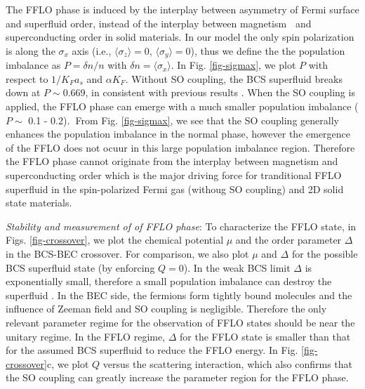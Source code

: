 \documentclass[prl,showpacs,twocolumn]{revtex4}
\begin{document}
The FFLO phase is induced by the interplay between asymmetry of Fermi
surface and superfluid order, instead of the interplay between magnetism%
\textbf{\ }and superconducting order in solid materials. In our model the
only spin polarization is along the $\sigma _{x}$ axis (i.e., $\langle
\sigma _{z}\rangle =0$, $\langle \sigma _{y}\rangle =0$), thus we define the
the population imbalance as $P=\delta n/n$ with $\delta n=\langle \sigma
_{x}\rangle $. In Fig. \ref{fig-sigmax}, we plot $P$ with respect to $%
1/K_{F}a_{s}$ and $\alpha K_{F}$. Without SO coupling, the BCS superfluid
breaks down at $P\sim 0.669$, in consistent with previous results \cite%
{Hu,Zwierlein05}. When the SO coupling is applied, the FFLO phase can emerge
with a much smaller population imbalance ($P\sim $ 0.1 - 0.2).\textbf{\ }From Fig. %
\ref{fig-sigmax}, we see that the SO coupling generally enhances the
population imbalance in the normal phase, however the emergence of the FFLO
does not ocuur in this large population imbalance region. Therefore the FFLO
phase cannot originate from the interplay between magnetism and superconducting
order which is the major driving force for tranditional FFLO superfluid in 
the spin-polarized Fermi gas (withoug SO coupling) and 2D solid state materials.

\textit{Stability and measurement of of FFLO phase}: To characterize the
FFLO state, in Figs. \ref{fig-crossover}, we plot the chemical potential $%
\mu $ and the order parameter $\Delta $ in the BCS-BEC crossover. For
comparison, we also plot $\mu $ and $\Delta $ for the possible BCS
superfluid state (by enforcing $Q=0$). In the weak BCS limit $\Delta $ is
exponentially small, therefore a small population imbalance can destroy the
superfluid \cite{Zwierlein06}. In the BEC side, the fermions form tightly
bound molecules and the influence of Zeeman field and SO coupling is
negligible. Therefore the only relevant parameter regime for the observation
of FFLO states should be near the unitary regime. In the FFLO regime, $%
\Delta $ for the FFLO state is smaller than that for the assumed BCS
superfluid to reduce the FFLO energy. In Fig. \ref{fig-crossover}c, we plot $%
Q$ versus the scattering interaction, which also confirms that the SO
coupling can greatly increase the parameter region for the FFLO phase.
\end{document}
